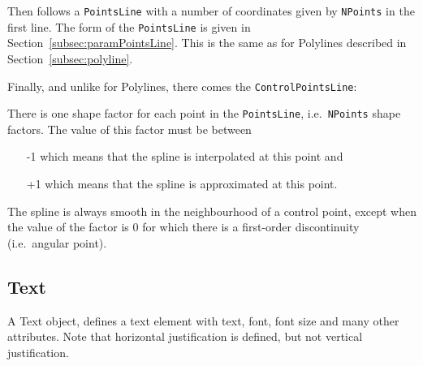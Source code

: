 \documentclass[10pt, a4paper]{article}%
\begin{document}
Then follows a \texttt{PointsLine} with a number of coordinates 
given by \texttt{NPoints} in the first line. 
The form of the \texttt{PointsLine} is given 
in Section~\ref{subsec:paramPointsLine}. 
This is the same as for Polylines described in Section~\ref{subsec:polyline}. 

Finally, and unlike for Polylines, there comes the \texttt{ControlPointsLine}: 

There is one shape factor for each point in the \texttt{PointsLine}, 
i.e.~\texttt{NPoints} shape factors. 
The value of this factor must be between 
%
\begin{itemize}
\item[-1] which means that the spline is interpolated at this point  and 
\item[+1] which means that the spline is approximated at this point. 
\end{itemize}
%
The spline is always smooth in the neighbourhood of a control point, 
except when the value of the factor is 0 
for which there is a first-order discontinuity (i.e.~angular point).


\subsection{Text}\label{subsec:text}

A Text object, defines a text element 
with text, font, font size and many other attributes. 
Note that horizontal justification is defined, 
but not vertical justification. 
\end{document}
